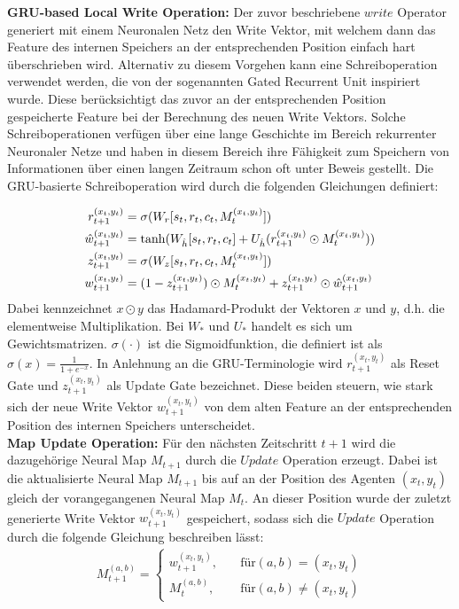 \textbf{GRU-based Local Write Operation:} Der zuvor beschriebene $write$ Operator generiert mit einem Neuronalen Netz den Write Vektor, mit welchem dann das Feature des internen Speichers an der entsprechenden Position einfach hart überschrieben wird. Alternativ zu diesem Vorgehen kann eine Schreiboperation verwendet werden, die von der sogenannten Gated Recurrent Unit inspiriert wurde. Diese berücksichtigt das zuvor an der entsprechenden Position gespeicherte Feature bei der Berechnung des neuen Write Vektors. Solche Schreiboperationen verfügen über eine lange Geschichte im Bereich rekurrenter Neuronaler Netze und haben in diesem Bereich ihre Fähigkeit zum Speichern von Informationen über einen langen Zeitraum schon oft unter Beweis gestellt. Die GRU-basierte Schreiboperation wird durch die folgenden Gleichungen definiert:

\begin{equation}
  \begin{align}
    r_{t+1}^{(x_t,y_t)} &= \sigma(W_r[s_t, r_t, c_t, M_t^{(x_t,y_t)}]) \\
    \hat{w}_{t+1}^{(x_t,y_t)} &= \tanh (W_{\hat{h}}[s_t, r_t, c_t] + U_{\hat{h}}(r_{t+1}^{(x_t,y_t)} \odot M_t^{(x_t,y_t)})) \\
    z_{t+1}^{(x_t,y_t)} & = \sigma(W_z[s_t, r_t, c_t, M_t^{(x_t,y_t)}]) \\
    w_{t+1}^{(x_t,y_t)} &= (1 - z_{t+1}^{(x_t,y_t)}) \odot M_t^{(x_t,y_t)} + z_{t+1}^{(x_t,y_t)} \odot \hat{w}_{t+1}^{(x_t,y_t)}
  \end{aligned}
\end{equation}
Dabei kennzeichnet $x \odot y$ das Hadamard-Produkt der Vektoren $x$ und $y$, d.h. die elementweise Multiplikation. Bei $W_*$ und $U_*$ handelt es sich um Gewichtsmatrizen. $\sigma(\cdot)$ ist die Sigmoidfunktion, die definiert ist als $\sigma(x) = \frac{1}{1+e^{-x}}$. In Anlehnung an die GRU-Terminologie wird $r_{t+1}^{(x_t,y_t)}$ als Reset Gate und $z_{t+1}^{(x_t,y_t)}$ als Update Gate bezeichnet. Diese beiden steuern, wie stark sich der neue Write Vektor $w_{t+1}^{(x_t,y_t)}$ von dem alten Feature an der entsprechenden Position des internen Speichers unterscheidet.\\[0.1in]
\textbf{Map Update Operation:} Für den nächsten Zeitschritt $t+1$ wird die dazugehörige Neural Map $M_{t+1}$ durch die $Update$ Operation erzeugt. Dabei ist die aktualisierte Neural Map $M_{t+1}$ bis auf an der Position des Agenten $(x_t,y_t)$ gleich der vorangegangenen Neural Map $M_t$. An dieser Position wurde der zuletzt generierte Write Vektor $w_{t+1}^{(x_t,y_t)}$ gespeichert, sodass sich die $Update$ Operation durch die folgende Gleichung beschreiben lässt:
\begin{equation}
  \begin{aligned}
    M_{t+1}^{(a,b)} =
    \begin{cases}
      w_{t+1}^{(x_t,y_t)}, & \quad \text{für} (a,b) = (x_t,y_t) \\
      M_t^{(a,b)}, & \quad \text{für} (a,b) \ne (x_t,y_t)
    \end{cases}
  \end{aligned}
\end{equation}

